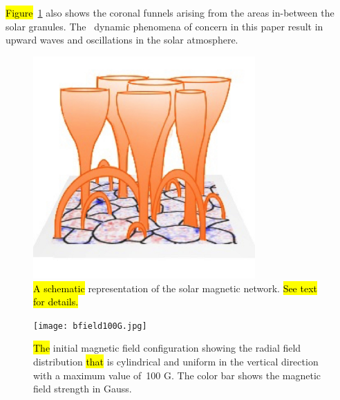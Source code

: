 \documentclass[physics,article,accept,pdftex,moreauthors]{Definitions/mdpi}
\begin{document}
  \hl{Figure}~\ref{fig1} %
also shows the coronal funnels arising from the areas in-between the solar granules. The~ dynamic phenomena of concern in this paper result in  upward waves and oscillations in the solar atmosphere. 
\begin{figure}[H]
\includegraphics[width=8.5cm]{solar-network-v1.jpg}
\caption{\hl{A schematic} %
 representation of the solar magnetic network. 
 \hl{See text for details.} %
\label{fig1}}
\end{figure}
\unskip

\begin{figure}[H]
\texttt{[image: bfield100G.jpg]}
\caption{\hl{The} %
 initial magnetic field configuration showing the radial field distribution {%
\hl{that}%
} is cylindrical and uniform in the vertical direction with a maximum value of~100 G. The color bar shows the magnetic field strength in Gauss.\label{fig2}}%
\end{figure}
\end{document}
